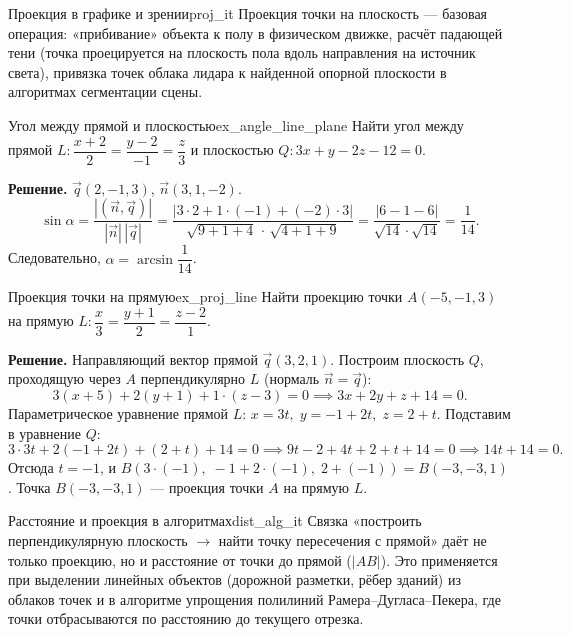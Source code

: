 \documentclass[12pt,a4paper]{article}
\begin{document}
\begin{remarkIT}{Проекция в графике и зрении}{proj_it}
  Проекция точки на плоскость --- базовая операция: «прибивание»
  объекта к полу в физическом движке, расчёт падающей тени (точка
    проецируется на плоскость пола вдоль направления на источник
  света), привязка точек облака лидара к найденной опорной плоскости в
  алгоритмах сегментации сцены.
\end{remarkIT}

\begin{definition}{Угол между прямой и плоскостью}{ex_angle_line_plane}
  Найти угол между прямой
  $L\colon \dfrac{x+2}{2} = \dfrac{y-2}{-1} = \dfrac{z}{3}$ и
  плоскостью $Q\colon 3x + y - 2z - 12 = 0$.

  \textbf{Решение.} $\vec{q}(2,-1,3)$, $\vec{n}(3,1,-2)$.
  \[
    \sin\alpha = \frac{|(\vec{n}, \vec{q})|}{|\vec{n}|\,|\vec{q}|}
    = \frac{|3\cdot 2 + 1\cdot(-1) + (-2)\cdot 3|}
    {\sqrt{9+1+4}\,\cdot\,\sqrt{4+1+9}}
    = \frac{|6 - 1 - 6|}{\sqrt{14}\cdot\sqrt{14}} = \frac{1}{14}.
  \]
  Следовательно, $\alpha = \arcsin\dfrac{1}{14}$.
\end{definition}

\begin{definition}{Проекция точки на прямую}{ex_proj_line}
  Найти проекцию точки $A(-5,-1,3)$ на прямую
  $L\colon \dfrac{x}{3} = \dfrac{y+1}{2} = \dfrac{z-2}{1}$.

  \textbf{Решение.} Направляющий вектор прямой $\vec{q}(3,2,1)$.
  Построим плоскость $Q$, проходящую через $A$ перпендикулярно $L$
  (нормаль $\vec{n} = \vec{q}$):
  \[
    3(x+5) + 2(y+1) + 1\cdot(z-3) = 0 \implies 3x + 2y + z + 14 = 0.
  \]
  Параметрическое уравнение прямой $L$:
  $x = 3t,\; y = -1 + 2t,\; z = 2 + t$. Подставим в уравнение $Q$:
  \[
    3\cdot 3t + 2(-1 + 2t) + (2 + t) + 14 = 0
    \implies 9t - 2 + 4t + 2 + t + 14 = 0
    \implies 14t + 14 = 0.
  \]
  Отсюда $t = -1$, и
  $B(3\cdot(-1),\; -1 + 2\cdot(-1),\; 2 + (-1)) = B(-3, -3, 1)$.
  Точка $B(-3,-3,1)$ --- проекция точки $A$ на прямую $L$.
\end{definition}

\begin{remarkIT}{Расстояние и проекция в алгоритмах}{dist_alg_it}
  Связка «построить перпендикулярную плоскость $\to$ найти точку
  пересечения с прямой» даёт не только проекцию, но и расстояние от
  точки до прямой ($|AB|$). Это применяется при выделении линейных
  объектов (дорожной разметки, рёбер зданий) из облаков точек и в
  алгоритме упрощения полилиний Рамера--Дугласа--Пекера, где точки
  отбрасываются по расстоянию до текущего отрезка.
\end{remarkIT}
\end{document}
